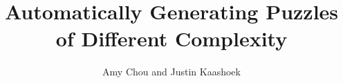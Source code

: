 \documentclass[12pt]{article}
\begin{document}
\doublespacing

\title{Automatically Generating Puzzles of Different Complexity}
\author{Amy Chou and Justin Kaashoek}

\maketitle











\newpage


\end{document}
